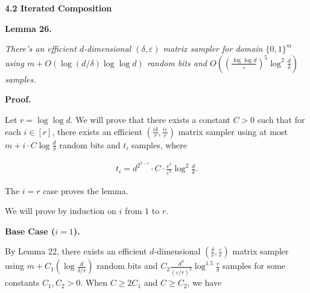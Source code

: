\documentclass[10pt,a4paper]{article}
\begin{document}
\par\medskip\noindent\textbf{
4.2 Iterated Composition}\par





\par\medskip\noindent\textbf{
\textbf{Lemma 26}\textbf{.}
}\par



\emph{There’s an efficient $d$-dimensional $(\delta,\varepsilon)$ matrix sampler for domain $\{0,1\}^{m}$ using $m+O(\log(d/\delta)\log\log d)$ random bits and $O((\frac{\log\log d}{\varepsilon})^{5}\log^{2}\frac{d}{\delta})$ samples.}\par






\par\medskip\noindent\textbf{Proof.}\par




Let $r=\log\log d$.
We will prove that there exists a constant $C>0$ such that for each $i\in[r]$, there exists an efficient $\left(\frac{i\delta}{r},\frac{i\varepsilon}{r}\right)$ matrix sampler using at most $m+i\cdot C\log\frac{d}{\delta}$ random bits and $t_{i}$ samples, where\par


\[\begin{gathered}
t_{i}=d^{2^{3-i}}\cdot C\cdot\frac{r^{5}}{\varepsilon^{5}}\log^{2}\frac{d}{\delta}.
\end{gathered}\]


The $i=r$ case proves the lemma.\par




We will prove by induction on $i$ from $1$ to $r$.\par





\par\medskip\noindent\textbf{Base Case ($i=1$).}\par




By Lemma 22, there exists an efficient $d$-dimensional $(\frac{\delta}{r},\frac{\varepsilon}{r})$ matrix sampler using $m+C_{1}(\log\frac{d}{\delta/r})$ random bits and $C_{2}\frac{d^{3}}{(\varepsilon/r)^{3}}\log^{1.5}\frac{r}{\delta}$ samples for some constants $C_{1},C_{2}>0$. When $C\geq 2C_{1}$ and $C\geq C_{2}$, we have\par
\end{document}
